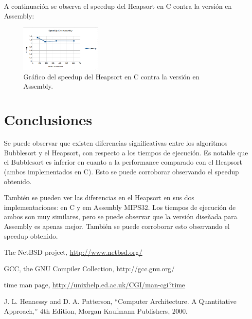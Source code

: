 \documentclass{article}
\begin{document}
	A continuación se observa el speedup del Heapsort en C contra la versión en Assembly:
	\medskip

	\begin{figure}[H]
		\centering
		\includegraphics[width=0.36\textwidth]{SpeedUpCvsAssembly.png}
		\medskip
		\caption{Gráfico del speedup del Heapsort en C contra la versión en Assembly.}
	\end{figure}
	\bigskip\bigskip


\newpage
\section{Conclusiones}
	\par
	Se puede observar que existen diferencias significativas entre los algoritmos Bubblesort y el Heapsort, con respecto a los tiempos de ejecución. Es notable que el Bubblesort es inferior en cuanto a la performance comparado con el Heapsort (ambos implementados en C). Esto se puede corroborar observando el speedup obtenido.

	También se pueden ver las diferencias en el Heapsort en sus dos implementaciones: en C y em Assembly MIPS32. Los tiempos de ejecución de ambos son muy similares, pero se puede observar que la versión diseñada para Assembly es apenas mejor. También se puede corroborar esto observando el speedup obtenido.

\bigskip


\begin{thebibliography}{99}

	 The NetBSD project, \url{http://www.netbsd.org/}

	 GCC, the GNU Compiler Collection, \url{http://gcc.gnu.org/}

	 time man page, \url{http://unixhelp.ed.ac.uk/CGI/man-cgi?time}

	 J. L. Hennessy and D. A. Patterson, ``Computer Architecture. A Quantitative
	Approach,'' 4th Edition, Morgan Kaufmann Publishers, 2000.

	\end{thebibliography}

\newpage
\end{document}
